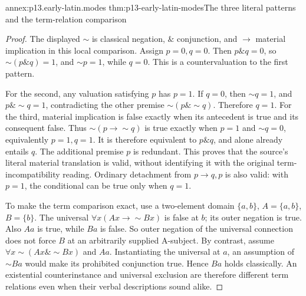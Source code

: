 \begin{annexitem}{annex:p13.early-latin.modes}
 {thm:p13-early-latin-modes}{The three literal patterns and the term-relation comparison}
\begin{proof}
The displayed \(\sim\) is classical negation, \(\&\) conjunction,
and \(\to\) material implication in this local comparison.
Assign \(p=0,q=0\). Then \(p\&q=0\), so \(\sim(p\&q)=1\),
and \(\sim p=1\), while \(q=0\). This is a countervaluation to
the first pattern.

For the second, any valuation satisfying \(p\) has \(p=1\).
If \(q=0\), then \(\sim q=1\), and \(p\&\sim q=1\), contradicting
the other premise \(\sim(p\&\sim q)\). Therefore \(q=1\).
For the third, material implication is false exactly when its antecedent
is true and its consequent false. Thus
\(\sim(p\to\sim q)\) is true exactly when \(p=1\) and
\(\sim q=0\), equivalently \(p=1,q=1\).
It is therefore equivalent to \(p\&q\), and alone already entails \(q\).
The additional premise \(p\) is redundant.
This proves that the source's literal material translation is valid,
without identifying it with the original term-incompatibility reading.
Ordinary detachment from \(p\to q,p\) is also valid: with \(p=1\),
the conditional can be true only when \(q=1\).

To make the term comparison exact, use a two-element domain \(\{a,b\}\),
\(A=\{a,b\}\), \(B=\{b\}\).
The universal \(\forall x(Ax\to\sim Bx)\) is false at \(b\);
its outer negation is true. Also \(Aa\) is true, while \(Ba\) is false.
So outer negation of the universal connection does not force \(B\)
at an arbitrarily supplied A-subject.
By contrast, assume \(\forall x\sim(Ax\&\sim Bx)\) and \(Aa\).
Instantiating the universal at \(a\), an assumption of \(\sim Ba\)
would make its prohibited conjunction true. Hence \(Ba\) holds classically.
An existential counterinstance and universal exclusion are therefore
different term relations even when their verbal descriptions sound alike.
\end{proof}
\end{annexitem}

